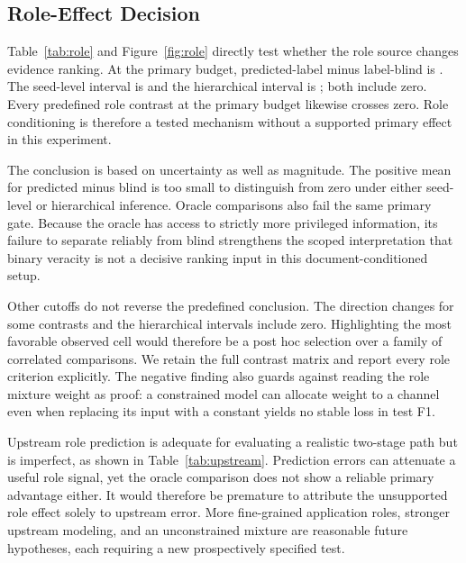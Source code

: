 \documentclass[applsci,article,submit,moreauthors]{Definitions/mdpi}
\begin{document}
\subsection{Role-Effect Decision}
Table~\ref{tab:role} and Figure~\ref{fig:role} directly test whether the role source changes evidence ranking. At the primary budget, predicted-label minus label-blind is \RoleKThreeDelta{}. The seed-level interval is \RoleKThreeTCI{} and the hierarchical interval is \RoleKThreeHierCI{}; both include zero. Every predefined role contrast at the primary budget likewise crosses zero. Role conditioning is therefore a tested mechanism without a supported primary effect in this experiment.

The conclusion is based on uncertainty as well as magnitude. The positive mean for predicted minus blind is too small to distinguish from zero under either seed-level or hierarchical inference. Oracle comparisons also fail the same primary gate. Because the oracle has access to strictly more privileged information, its failure to separate reliably from blind strengthens the scoped interpretation that binary veracity is not a decisive ranking input in this document-conditioned setup.

Other cutoffs do not reverse the predefined conclusion. The direction changes for some contrasts and the hierarchical intervals include zero. Highlighting the most favorable observed cell would therefore be a post hoc selection over a family of correlated comparisons. We retain the full contrast matrix and report every role criterion explicitly. The negative finding also guards against reading the role mixture weight as proof: a constrained model can allocate weight to a channel even when replacing its input with a constant yields no stable loss in test F1.

Upstream role prediction is adequate for evaluating a realistic two-stage path but is imperfect, as shown in Table~\ref{tab:upstream}. Prediction errors can attenuate a useful role signal, yet the oracle comparison does not show a reliable primary advantage either. It would therefore be premature to attribute the unsupported role effect solely to upstream error. More fine-grained application roles, stronger upstream modeling, and an unconstrained mixture are reasonable future hypotheses, each requiring a new prospectively specified test.

\begin{table}[H]
\caption{Paired role-source contrasts. Hierarchical intervals resample source documents within training seeds. Oracle contrasts are conditional.}\label{tab:role}
\centering\resizebox{\textwidth}{!}{}
\end{table}
\end{document}
